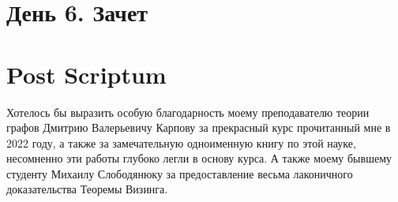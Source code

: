 \documentclass{article}
\theoremstyle{definition}
\theoremstyle{remark}
\begin{document}
\section{День 6. Зачет}


\section{Post Scriptum}

 Хотелось бы выразить особую благодарность моему преподавателю теории графов Дмитрию Валерьевичу Карпову за прекрасный курс прочитанный мне в 2022 году, а также за замечательную одноименную книгу по этой науке, несомненно эти работы глубоко легли в основу курса. А также моему бывшему студенту Михаилу Слободянюку за предоставление весьма лаконичного доказательства Теоремы Визинга.
 
\end{document}
